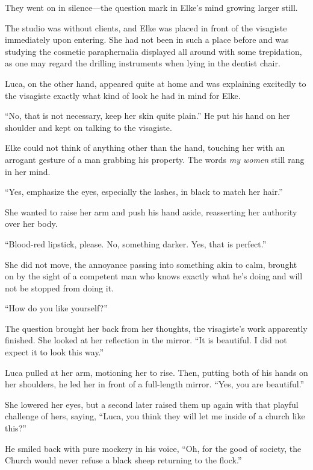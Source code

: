 They went on in silence---the question mark in Elke's mind growing larger still.

\sectionline

The studio was without clients, and Elke was placed in front of the visagiste immediately upon entering. She had not been in such a place before and was studying the cosmetic paraphernalia displayed all around with some trepidation, as one may regard the drilling instruments when lying in the dentist chair.

Luca, on the other hand, appeared quite at home and was explaining excitedly to the visagiste exactly what kind of look he had in mind for Elke.

``No, that is not necessary, keep her skin quite plain.'' He put his hand on her shoulder and kept on talking to the visagiste.

Elke could not think of anything other than the hand, touching her with an arrogant gesture of a man grabbing his property. The words \emph{my women} still rang in her mind.

``Yes, emphasize the eyes, especially the lashes, in black to match her hair.''

She wanted to raise her arm and push his hand aside, reasserting her authority over her body.

``Blood-red lipstick, please. No, something darker. Yes, that is perfect.''

She did not move, the annoyance passing into something akin to calm, brought on by the sight of a competent man who knows exactly what he's doing and will not be stopped from doing it.

``How do you like yourself?''

The question brought her back from her thoughts, the visagiste's work apparently finished. She looked at her reflection in the mirror. ``It is beautiful. I did not expect it to look this way.''

Luca pulled at her arm, motioning her to rise. Then, putting both of his hands on her shoulders, he led her in front of a full-length mirror. ``Yes, you are beautiful.''

She lowered her eyes, but a second later raised them up again with that playful challenge of hers, saying, ``Luca, you think they will let me inside of a church like this?''

He smiled back with pure mockery in his voice, ``Oh, for the good of society, the Church would never refuse a black sheep returning to the flock.''

